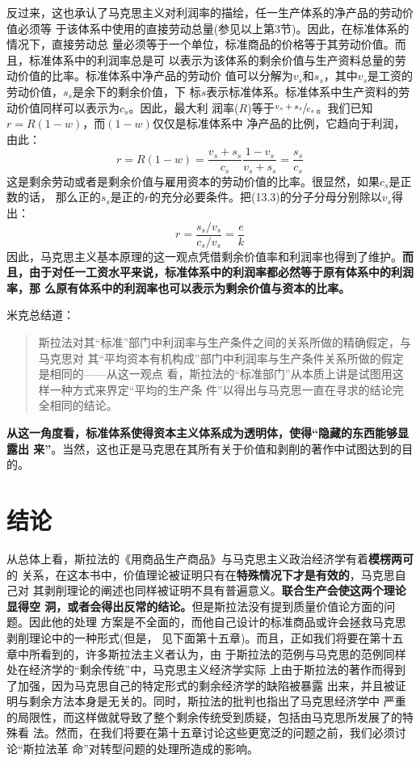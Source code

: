 反过来，这也承认了马克思主义对利润率的描绘，任一生产体系的净产品的劳动价值必须等
于该体系中使用的直接劳动总量(参见以上第3节)。因此，在标准体系的情况下，直接劳动总
量必须等于一个单位，标准商品的价格等于其劳动价值。而且，标准体系中的利润率总是可
以表示为该体系的剩余价值与生产资料总量的劳动价值的比率。标准体系中净产品的劳动价
值可以分解为$v_s和s_s$，其中$v_s$是工资的劳动价值，$s_s$是余下的剩余价值，下
标$s$表示标准体系。标准体系中生产资料的劳动价值同样可以表示为$c_s$。因此，最大利
润率($R$)等于$\sfrac{v_s+s_s}{c_s}$。我们已知$r=R(1-w)，而(1-w)$仅仅是标准体系中
净产品的比例，它趋向于利润，由此：
\begin{equation}
  r=R(1-w)=\frac{v_s+s_s}{c_s} \frac{1-v_s}{v_s+s_s} = \frac{s_s}{c_s}
\end{equation}
这是剩余劳动或者是剩余价值与雇用资本的劳动价值的比率。很显然，如果$c_s$是正数的话，
那么正的$s_s$是正的$r$的充分必要条件。把(13.3)的分子分母分别除以$v_s$得出：
\begin{equation}
r=\frac{s_s/v_s}{c_s/v_s}=\frac{e}{k}
\end{equation}
因此，马克思主义基本原理的这一观点凭借剩余价值率和利润率也得到了维护。\textbf{而
  且，由于对任一工资水平来说，标准体系中的利润率都必然等于原有体系中的利润率，那
  么原有体系中的利润率也可以表示为剩余价值与资本的比率。}

米克总结道：
\begin{quotation}
  斯拉法对其“标准”部门中利润率与生产条件之间的关系所做的精确假定，与马克思对
  其“平均资本有机构成”部门中利润率与生产条件关系所做的假定是相同的——从这一观点
  看，斯拉法的“标准部门”从本质上讲是试图用这样一种方式来界定“平均的生产条
  件”以得出与马克思一直在寻求的结论完全相同的结论。
\end{quotation}

\textbf{从这一角度看，标准体系使得资本主义体系成为透明体，使得“隐藏的东西能够显露出
来”}。当然，这也正是马克思在其所有关于价值和剥削的著作中试图达到的目的。

\section{结论}

从总体上看，斯拉法的《用商品生产商品》与马克思主义政治经济学有着\textbf{模楞两可}的
关系，在这本书中，价值理论被证明只有在\textbf{特殊情况下才是有效的}，马克思自己对
其剥削理论的阐述也同样被证明不具有普遍意义。\textbf{联合生产会使这两个理论显得空
  洞，或者会得出反常的结论。}但是斯拉法没有提到质量价值论方面的问题。因此他的处理
方案是不全面的，而他自己设计的标准商品或许会拯救马克思剥削理论中的一种形式(但是，
见下面第十五章)。而且，正如我们将要在第十五章中所看到的，许多斯拉法主义者认为，由
于斯拉法的范例与马克思的范例同样处在经济学的“剩余传统”中，马克思主义经济学实际
上由于斯拉法的著作而得到了加强，因为马克思自己的特定形式的剩余经济学的缺陷被暴露
出来，并且被证明与剩余方法本身是无关的。同时，斯拉法的批判也指出了马克思经济学中
严重的局限性，而这样做就导致了整个剩余传统受到质疑，包括由马克思所发展了的特殊看
法。然而，在我们将要在第十五章讨论这些更宽泛的问题之前，我们必须讨论“斯拉法革
命”对转型问题的处理所造成的影响。




